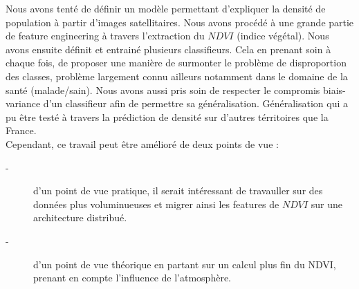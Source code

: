 \documentclass{book}
\begin{document}
Nous avons tenté de définir un modèle permettant d'expliquer la densité de population à partir d'images
satellitaires. Nous avons procédé à une grande partie de \og feature engineering \fg{} à travers l'extraction 
du $NDVI$ (indice végétal). Nous avons ensuite définit et entrainé plusieurs classifieurs. Cela en prenant soin à chaque
fois, de proposer une manière de surmonter le problème de disproportion des classes, problème largement connu ailleurs
notamment dans le domaine de la santé (malade/sain). Nous avons aussi pris soin de respecter le compromis biais-variance
d'un classifieur afin de permettre sa généralisation. Généralisation qui a pu être testé à travers la 
prédiction de densité sur d'autres térritoires que la France.\\
Cependant, ce travail peut être amélioré de deux points de vue : 
\begin{description}
\item[-] d'un point de vue pratique, il serait intéressant de travauller sur des données plus voluminueuses et migrer 
ainsi les features de $NDVI$ sur une architecture distribué.
\item[-] d'un point de vue théorique en partant sur un calcul plus fin du NDVI, prenant en compte l'influence de 
l'atmosphère.
\end{description}

\backmatter

\listoftables

\listoffigures



\end{document}
